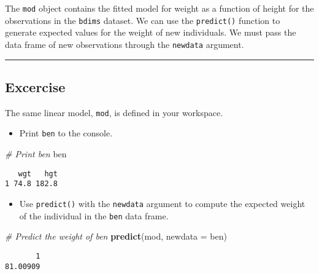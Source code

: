 \documentclass[
]{book}
\newenvironment{Shaded}{\begin{snugshade}}{\end{snugshade}}
\newcommand{\CommentTok}[1]{\textcolor[rgb]{0.56,0.35,0.01}{\textit{#1}}}
\newcommand{\DataTypeTok}[1]{\textcolor[rgb]{0.13,0.29,0.53}{#1}}
\newcommand{\KeywordTok}[1]{\textcolor[rgb]{0.13,0.29,0.53}{\textbf{#1}}}
\newcommand{\NormalTok}[1]{#1}
\providecommand{\tightlist}{%
  \setlength{\itemsep}{0pt}\setlength{\parskip}{0pt}}
\begin{document}
The \texttt{mod} object contains the fitted model for weight as a function of height for the observations in the \texttt{bdims} dataset. We can use the \texttt{predict()} function to generate expected values for the weight of new individuals. We must pass the data frame of new observations through the \texttt{newdata} argument.

\begin{center}\rule{0.5\linewidth}{0.5pt}\end{center}

\hypertarget{excercise-3}{%
\subsection*{Excercise}\label{excercise-3}}

The same linear model, \texttt{mod}, is defined in your workspace.

\begin{itemize}
\tightlist
\item
  Print \texttt{ben} to the console.
\end{itemize}

\begin{Shaded}
\begin{Highlighting}[]
\CommentTok{# Print ben}
\NormalTok{ben}
\end{Highlighting}
\end{Shaded}

\begin{verbatim}
   wgt   hgt
1 74.8 182.8
\end{verbatim}

\begin{itemize}
\tightlist
\item
  Use \texttt{predict()} with the \texttt{newdata} argument to compute the expected weight of the individual in the \texttt{ben} data frame.
\end{itemize}

\begin{Shaded}
\begin{Highlighting}[]
\CommentTok{# Predict the weight of ben}
\KeywordTok{predict}\NormalTok{(mod, }\DataTypeTok{newdata =}\NormalTok{ ben)}
\end{Highlighting}
\end{Shaded}

\begin{verbatim}
       1 
81.00909 
\end{verbatim}
\end{document}
